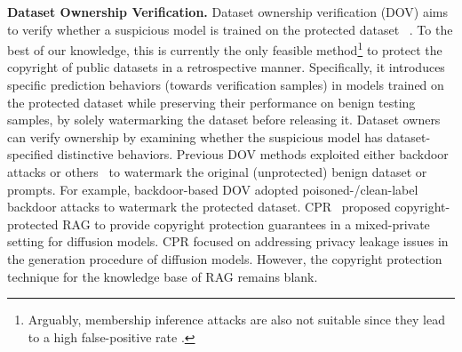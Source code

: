  




\noindent \textbf{Dataset Ownership Verification.} Dataset ownership verification (DOV) aims to verify whether a suspicious model is trained on the protected dataset ~\citep{li2022untargeted,li2023black,guo2023domain,wei2024pointncbw,yao2024promptcare}. To the best of our knowledge, this is currently the only feasible method\footnote{Arguably, membership inference attacks are also not suitable since they lead to a high false-positive rate \cite{du2025sok}. } to protect the copyright of public datasets in a retrospective manner. Specifically, it introduces specific prediction behaviors (towards verification samples) in models trained on the protected dataset while preserving their performance on benign testing samples, by solely watermarking the dataset before releasing it. Dataset owners can verify ownership by examining whether the suspicious model has dataset-specified distinctive behaviors. Previous DOV methods \citep{li2022untargeted,li2023black,tang2023did} exploited either backdoor attacks or others~\citep{guo2023domain} to watermark the original (unprotected) benign dataset or prompts. For example, backdoor-based DOV adopted poisoned-/clean-label backdoor attacks to watermark the protected dataset. %
CPR~\citep{golatkar2024cpr} proposed copyright-protected RAG to provide copyright protection guarantees in a mixed-private setting for diffusion models. CPR focused on addressing privacy leakage issues in the generation procedure of diffusion models. However, the copyright protection technique for the knowledge base of RAG remains blank.